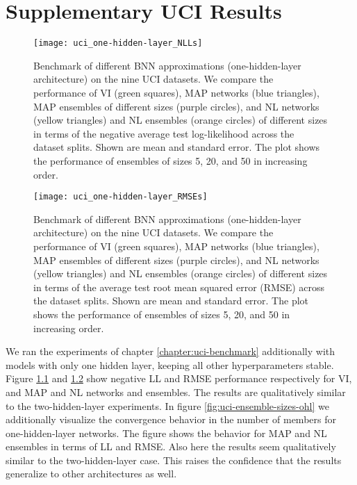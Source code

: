 \documentclass[../thesis.tex]{subfiles}
\begin{document}
\chapter{Supplementary UCI Results}
\label{appendix:uci-results}
\begin{figure}
    \centering
    \texttt{[image: uci\_one-hidden-layer\_NLLs]} 
    \caption{Benchmark of different BNN approximations (one-hidden-layer architecture) on the nine UCI datasets. We compare the performance of VI (green squares), MAP networks (blue triangles), MAP ensembles of different sizes (purple circles), and NL networks (yellow triangles) and NL ensembles (orange circles) of different sizes in terms of the negative average test log-likelihood across the dataset splits. Shown are mean and standard error. The plot shows the performance of ensembles of sizes 5, 20, and 50 in increasing order.}
    \label{fig:uci-benchmark-ohl-nll}
\end{figure}

\begin{figure}
    \centering
    \texttt{[image: uci\_one-hidden-layer\_RMSEs]} 
    \caption{Benchmark of different BNN approximations (one-hidden-layer architecture) on the nine UCI datasets. We compare the performance of VI (green squares), MAP networks (blue triangles), MAP ensembles of different sizes (purple circles), and NL networks (yellow triangles) and NL ensembles (orange circles) of different sizes in terms of the average test root mean squared error (RMSE) across the dataset splits. Shown are mean and standard error. The plot shows the performance of ensembles of sizes 5, 20, and 50 in increasing order.}
    \label{fig:uci-benchmark-ohl-rmse}
\end{figure}

We ran the experiments of chapter \ref{chapter:uci-benchmark} additionally with models with only one hidden layer, keeping all other hyperparameters stable. Figure \ref{fig:uci-benchmark-ohl-nll} and \ref{fig:uci-benchmark-ohl-rmse} show negative LL and RMSE performance respectively for VI, and MAP and NL networks and ensembles. The results are qualitatively similar to the two-hidden-layer experiments. In figure \ref{fig:uci-ensemble-sizes-ohl} we additionally visualize the convergence behavior in the number of members for one-hidden-layer networks. The figure shows the behavior for MAP and NL ensembles in terms of LL and RMSE. Also here the results seem qualitatively similar to the two-hidden-layer case. This raises the confidence that the results generalize to other architectures as well.
\end{document}
